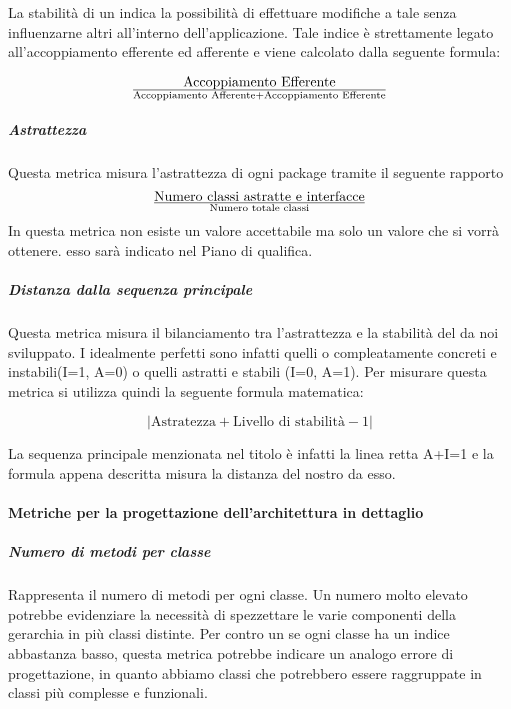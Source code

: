 La stabilità di un  indica la possibilità di effettuare modifiche a tale  senza influenzarne altri all'interno dell'applicazione. Tale indice è strettamente legato all'accoppiamento efferente ed afferente e viene calcolato dalla seguente formula:

\begin{displaymath}
{\text{Accoppiamento Efferente}}\over{\text{Accoppiamento Afferente} + \text{Accoppiamento Efferente}}
\end{displaymath}

\subparagraph{Astrattezza}
Questa metrica misura l'astrattezza di ogni package tramite il seguente rapporto 
\begin{displaymath}
{\text{Numero classi astratte e interfacce}}\over{\text{Numero totale classi}}
\end{displaymath}
In questa metrica non esiste un valore accettabile ma solo un valore che si vorrà ottenere. esso sarà indicato nel Piano di qualifica.

\subparagraph{Distanza dalla sequenza principale}
Questa metrica misura il bilanciamento tra l'astrattezza e la stabilità del  da noi sviluppato. I  idealmente perfetti sono infatti quelli o compleatamente concreti e instabili(I=1, A=0) o quelli astratti e stabili (I=0, A=1). Per misurare questa metrica si utilizza quindi la seguente formula matematica:

\begin{displaymath}
{|\text{Astratezza} + \text{Livello di stabilità} - 1|}
\end{displaymath}

La sequenza principale menzionata nel titolo è infatti la linea retta A+I=1 e la formula appena descritta misura la distanza del nostro  da esso.

\paragraph{Metriche per la progettazione dell'architettura in dettaglio}

\subparagraph{Numero di metodi per classe}
Rappresenta il numero di metodi per ogni classe.
Un numero molto elevato potrebbe evidenziare la necessità di spezzettare le varie componenti della gerarchia in più classi distinte.
Per contro un se ogni classe ha un indice abbastanza basso, questa metrica potrebbe indicare un analogo errore di progettazione, in quanto abbiamo classi che potrebbero essere raggruppate in classi più complesse e funzionali.


